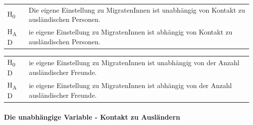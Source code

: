 \documentclass[]{article}
\let\oldparagraph\paragraph
\renewcommand{\paragraph}[1]{\oldparagraph{#1}\mbox{}}
\begin{document}
\begin{longtable}[]{@{}ll@{}}
\toprule
\begin{minipage}[t]{0.09\columnwidth}\raggedright\strut
H\textsubscript{0} \textbar{}\strut
\end{minipage} & \begin{minipage}[t]{0.85\columnwidth}\raggedright\strut
Die eigene Einstellung zu MigratenInnen ist unabhängig von Kontakt zu
ausländischen Personen.\strut
\end{minipage}\tabularnewline
\begin{minipage}[t]{0.09\columnwidth}\raggedright\strut
H\textsubscript{A} \textbar{} D\strut
\end{minipage} & \begin{minipage}[t]{0.85\columnwidth}\raggedright\strut
ie eigene Einstellung zu MigratenInnen ist abhängig von Kontakt zu
ausländischen Personen.\strut
\end{minipage}\tabularnewline
\bottomrule
\end{longtable}

\begin{longtable}[]{@{}ll@{}}
\toprule
\begin{minipage}[t]{0.09\columnwidth}\raggedright\strut
H\textsubscript{0} \textbar{} D\strut
\end{minipage} & \begin{minipage}[t]{0.85\columnwidth}\raggedright\strut
ie eigene Einstellung zu MigratenInnen ist unabhängig von der Anzahl
ausländischer Freunde.\strut
\end{minipage}\tabularnewline
\begin{minipage}[t]{0.09\columnwidth}\raggedright\strut
H\textsubscript{A} \textbar{} D\strut
\end{minipage} & \begin{minipage}[t]{0.85\columnwidth}\raggedright\strut
ie eigene Einstellung zu MigratenInnen ist abhängig von der Anzahl
ausländischer Freunde.\strut
\end{minipage}\tabularnewline
\bottomrule
\end{longtable}

\paragraph{Die unabhängige Variable - Kontakt zu
Ausländern}\label{die-unabhangige-variable---kontakt-zu-auslandern}
\end{document}
